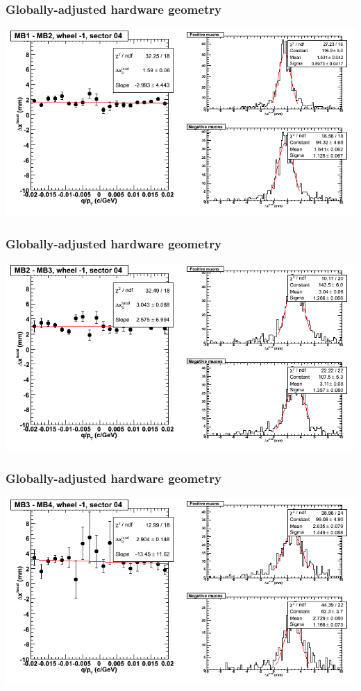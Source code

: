 \documentclass[compress]{beamer}
\begin{document}
\begin{frame}
\frametitle{Globally-adjusted hardware geometry}
\includegraphics[width=\linewidth]{NOV4_segdiffs_HW/dt13_resid_B_04_12.png}
\end{frame}

\begin{frame}
\frametitle{Globally-adjusted hardware geometry}
\includegraphics[width=\linewidth]{NOV4_segdiffs_HW/dt13_resid_B_04_23.png}
\end{frame}

\begin{frame}
\frametitle{Globally-adjusted hardware geometry}
\includegraphics[width=\linewidth]{NOV4_segdiffs_HW/dt13_resid_B_04_34.png}
\end{frame}
\end{document}
